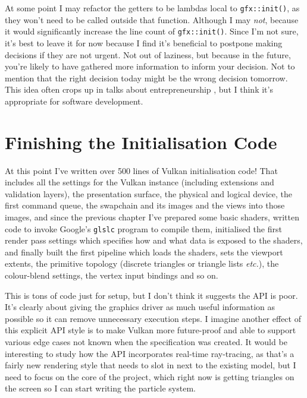 \documentclass[11pt, a4paper, twocolumn]{article}
\begin{document}
At some point I may refactor the getters to be lambdas local to \verb|gfx::init()|, as they won't need to be called outside that function. Although I may \emph{not}, because it would significantly increase the line count of \verb|gfx::init()|. Since I'm not sure, it's best to leave it for now because I find it's beneficial to postpone making decisions if they are not urgent. Not out of laziness, but because in the future, you're likely to have gathered more information to inform your decision. Not to mention that the right decision today might be the wrong decision tomorrow. This idea often crops up in talks about entrepreneurship \citep{Knott-Craig2017}, but I think it's appropriate for software development.

\section{Finishing the Initialisation Code}

At this point I've written over 500 lines of Vulkan initialisation code! That includes all the settings for the Vulkan instance (including extensions and validation layers), the presentation surface, the physical and logical device, the first command queue, the swapchain and its images and the views into those images, and since the previous chapter I've prepared some basic shaders, written code to invoke Google's \verb|glslc| program to compile them, initialised the first render pass settings which specifies how and what data is exposed to the shaders, and finally built the first pipeline which loads the shaders, sets the viewport extents, the primitive topology (discrete triangles or triangle lists \emph{etc.}), the colour-blend settings, the vertex input bindings and so on.

This is tons of code just for setup, but I don't think it suggests the API is poor. It's clearly about giving the graphics driver as much useful information as possible so it can remove unnecessary execution steps. I imagine another effect of this explicit API style is to make Vulkan more future-proof and able to support various edge cases not known when the specification was created. It would be interesting to study how the API incorporates real-time ray-tracing, as that's a fairly new rendering style that needs to slot in next to the existing model, but I need to focus on the core of the project, which right now is getting triangles on the screen so I can start writing the particle system.




\end{document}
